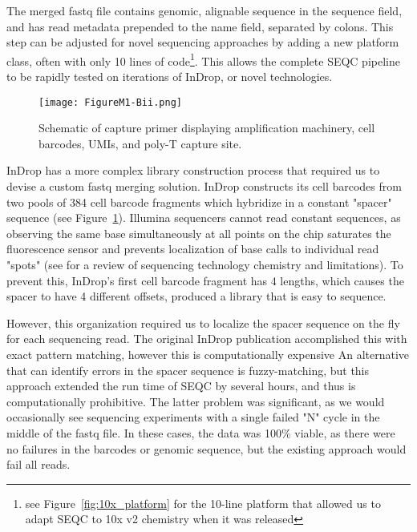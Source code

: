 The merged fastq file contains genomic, alignable sequence in the sequence field, and has read metadata prepended to the name field, separated by colons. This step can be adjusted for novel sequencing approaches by adding a new platform class, often with only 10 lines of code\footnote{see Figure~\ref{fig:10x_platform} for the 10-line platform that allowed us to adapt SEQC to 10x v2 chemistry when it was released}.
This allows the complete SEQC pipeline to be rapidly tested on iterations of InDrop, or novel technologies.

\begin{figure}
\centering
\texttt{[image: FigureM1-Bii.png]}
\caption{Schematic of capture primer displaying amplification machinery, cell barcodes, UMIs,
         and poly-T capture site.}
\label{fig:m1bii}
\end{figure}

InDrop has a more complex library construction process that required us to devise a custom fastq merging solution.
InDrop constructs its cell barcodes from two pools of 384 cell barcode fragments which hybridize in a constant "spacer" sequence (see Figure~\ref{fig:m1bii}).
Illumina sequencers cannot read constant sequences, as observing the same base simultaneously at all points on the chip saturates the fluorescence sensor and prevents localization of base calls to individual read "spots" (see \cite{Metzker2010} for a review of sequencing technology chemistry and limitations). 
To prevent this, InDrop's first cell barcode fragment has 4 lengths, which causes the spacer to have 4 different offsets, produced a library that is easy to sequence. 

However, this organization required us to localize the spacer sequence on the fly for each sequencing read. 
The original InDrop publication accomplished this with exact pattern matching, however this is computationally expensive
An alternative that can identify errors in the spacer sequence is fuzzy-matching, but this approach extended the run time of SEQC by several hours, and thus is computationally prohibitive.  
The latter problem was significant, as we would occasionally see sequencing experiments with a single failed "N" cycle in the middle of the fastq file. 
In these cases, the data was 100\% viable, as there were no failures in the barcodes or genomic sequence, but the existing approach would fail all reads. 

